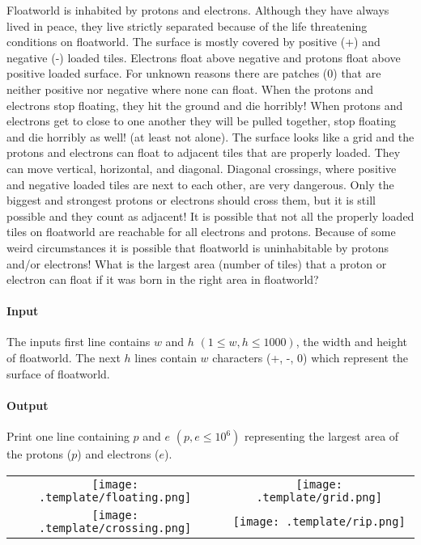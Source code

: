 




Floatworld is inhabited by protons and electrons.
 Although they have always lived in peace, they live strictly separated because of the life threatening conditions on floatworld. 
 The surface is mostly covered by positive (+) and negative (-) loaded tiles.
 Electrons float above negative and protons float above positive loaded surface. 
 For unknown reasons there are patches (0) that are neither positive nor negative where none can float. 
 When the protons and electrons stop floating, they hit the ground and die horribly!  
 When protons and electrons get to close to one another they will be pulled together, stop floating and die horribly as well! (at least not alone). 
 The surface looks like a grid and the protons and electrons can float to adjacent tiles that are properly loaded. 
 They can move vertical, horizontal, and diagonal. 
 Diagonal crossings, where positive and negative loaded tiles are next to each other, are very dangerous. 
 Only the biggest and strongest protons or electrons should cross them, but it is still possible and they count as adjacent! 
 It is possible that not all the properly loaded tiles on floatworld are reachable for all electrons and protons. 
 Because of some weird circumstances it is possible that floatworld is uninhabitable by protons and/or electrons! 
 What is the largest area (number of tiles) that a proton or electron can float if it was born in the right area in floatworld?

\paragraph*{Input}

The inputs first line contains $w$ and $h$ $(1 \leq w, h \leq 1000)$, the width and height of floatworld. The next $h$ lines contain $w$ characters (+, -, 0) which represent the surface of floatworld.

\paragraph*{Output}

Print one line containing $p$ and $e$ $(p,e \leq 10^6)$ representing the largest area of the protons ($p$) and electrons ($e$).


\begin{samples}
\end{samples}

\begin{tabular}{cc}
  \texttt{[image: .template/floating.png]}
    & \texttt{[image: .template/grid.png]} \\
  \texttt{[image: .template/crossing.png]}
    & \texttt{[image: .template/rip.png]} \\
\end{tabular}



